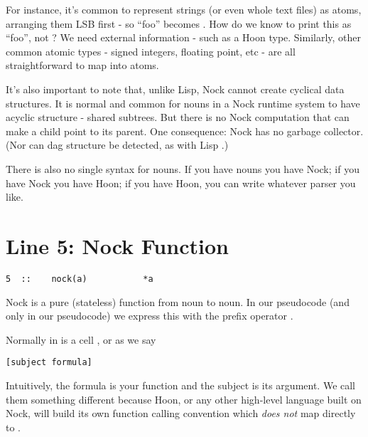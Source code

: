 For instance, it's common to represent strings (or even whole text files) as
atoms, arranging them LSB first - so ``foo'' becomes .  How do we know
to print this as ``foo'', not ?  We need external information - such as
a Hoon type.  Similarly, other common atomic types - signed integers, floating
point, etc
- are all straightforward to map into atoms.

It's also important to note that, unlike Lisp, Nock cannot create cyclical data
structures.  It is normal and common for nouns in a Nock runtime system to have
acyclic structure - shared subtrees.  But there is no Nock computation that can
make a child point to its parent.  One consequence: Nock has no garbage
collector.  (Nor can dag structure be detected, as with Lisp .)

There is also no single syntax for nouns.  If you have nouns you have Nock; if
you have Nock you have Hoon; if you have Hoon, you can write whatever parser
you like.

\section{Line 5: Nock Function}

\begin{framed_shaded}
\begin{Verbatim}[fontsize=\relsize{-2.5},fontseries=b,commandchars=\\\{\}]
5  ::    nock(a)           *a
\end{Verbatim}
\end{framed_shaded}
Nock is a pure (stateless) function from noun to noun.  In our pseudocode (and
only in our pseudocode) we express this with the prefix operator \kode{*}.

Normally  in  is a cell \kode{[s f]}, or as we say

\begin{framed_shaded}
\begin{Verbatim}[fontsize=\relsize{-2.5},fontseries=b,commandchars=\\\{\}]
[subject formula]
\end{Verbatim}
\end{framed_shaded}
Intuitively, the formula is your function and the subject is its argument.  We
call them something different because Hoon, or any other high-level language
built on Nock, will build its own function calling convention which \emph{does not}
map directly to .

